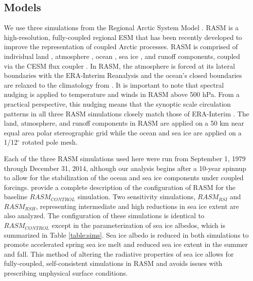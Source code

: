 \subsection{Models}
\label{sec:models}
We use three simulations from the Regional Arctic System Model \citep[RASM; ][]{Hamman_2016a,Roberts_2015a}.
RASM is a high-resolution, fully-coupled regional ESM that has been recently developed to improve the representation of coupled Arctic processes.
RASM is comprised of individual land \citep[see ][]{Hamman_2016a}, atmosphere \citep[see ][]{Cassano_2016}, ocean \citep[see ][]{Roberts_2015a}, sea ice \citep[see ][]{Roberts_2015a}, and runoff \citep[see ][]{Hamman_2016b} components, coupled via the CESM flux coupler \citet{Craig_2012}.
In RASM, the atmosphere is forced at its lateral boundaries with the ERA-Interim Reanalysis \citep{Dee_2011} and the ocean's closed boundaries are relaxed to the climatology from \citet{Steele_2001}.
It is important to note that spectral nudging is applied to temperature and winds in RASM above 500 hPa.
From a practical perspective, this nudging means that the synoptic scale circulation patterns in all three RASM simulations closely match those of ERA-Interim \citep{Glisan_2013}.
The land, atmosphere, and runoff components in RASM are applied on a 50 km near equal area polar stereographic grid while the ocean and sea ice are applied on a 1/12$^{\circ}$ rotated pole mesh.

Each of the three RASM simulations used here were run from September 1, 1979 through December 31, 2014, although our analysis begins after a 10-year spinnup to allow for the stabilization of the ocean and sea ice components under coupled forcings.
\citet{Hamman_2016b} provide a complete description of the configuration of RASM for the baseline $RASM_{CONTROL}$ simulation.
Two sensitivity simulations, $RASM_{RSI}$ and $RASM_{RSH}$, representing intermediate and high reductions in sea ice extent are also analyzed.
The configuration of these simulations is identical to $RASM_{CONTROL}$ except in the parameterization of sea ice albedos, which is summarized in Table \ref{table:sims}.
Sea ice albedo is reduced in both simulations to promote accelerated spring sea ice melt and reduced sea ice extent in the summer and fall.
This method of altering the radiative properties of sea ice allows for fully-coupled, self-consistent simulations in RASM and avoids issues with prescribing unphysical surface conditions.

